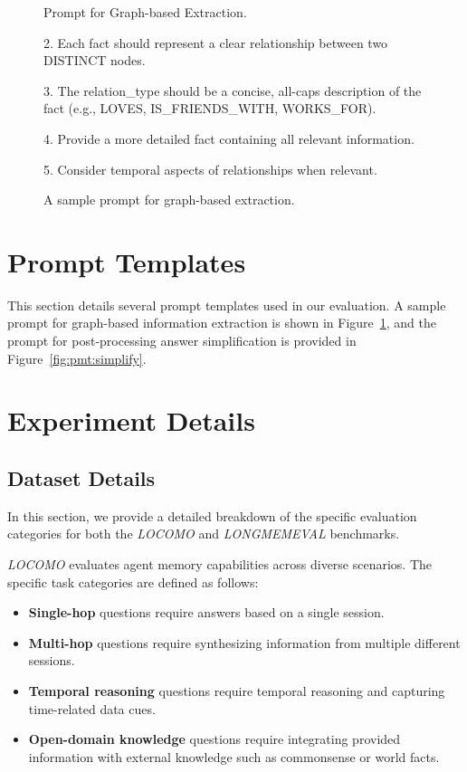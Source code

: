 \begin{figure}[h]
\begin{AIbox}{Prompt for Graph-based Extraction.}
{\begin{tcolorbox}[colback=gray!10, colframe=gray!20, boxrule=0pt, left=0pt, sharp corners, right=0pt]
2. Each fact should represent a clear relationship between two DISTINCT nodes.

3. The relation\_type should be a concise, all-caps description of the fact (e.g., LOVES, IS\_FRIENDS\_WITH,
WORKS\_FOR).

4. Provide a more detailed fact containing all relevant information.

5. Consider temporal aspects of relationships when relevant.
\end{tcolorbox}
}
\end{AIbox} 
\caption{A sample prompt for graph-based extraction.}
\label{fig:pmt:graph_extract}
\end{figure}











\section{Prompt Templates}
\label{sec:app:prompt}
This section details several prompt templates used in our evaluation. A sample prompt for graph-based information extraction is shown in Figure~\ref{fig:pmt:graph_extract}, and the prompt for post-processing answer simplification is provided in Figure~\ref{fig:pmt:simplify}.






\section{Experiment Details}
\label{sec:app:exp}

\subsection{Dataset Details}
\label{sec:app:exp:detail}
\noindent In this section, we provide a detailed breakdown of the specific evaluation categories for both the \textit{LOCOMO} and \textit{LONGMEMEVAL} benchmarks.

\noindent \textit{LOCOMO} evaluates agent memory capabilities across diverse scenarios. The specific task categories are defined as follows:
\begin{itemize}[topsep=1mm, partopsep=0pt, itemsep=0pt, leftmargin=10pt]
    \item \textbf{Single-hop} questions require answers based on a single session.
    \item \textbf{Multi-hop} questions require synthesizing information from multiple different sessions.
    \item \textbf{Temporal reasoning} questions require temporal reasoning and capturing time-related data cues.
    \item \textbf{Open-domain knowledge} questions require integrating provided information with external knowledge such as commonsense or world facts.
\end{itemize}

